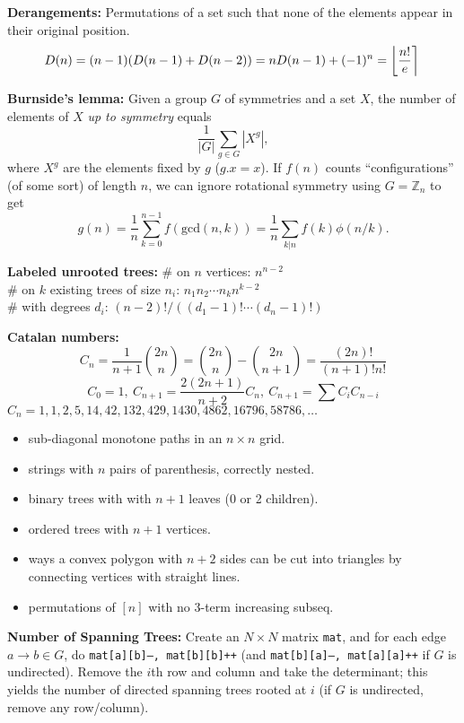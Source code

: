 \noindent
\textbf{Derangements:}
\noindent
Permutations of a set such that none of the elements appear in their original position.
\[ \mkern-2mu D(n) = (n-1)(D(n-1)+D(n-2)) = n D(n-1)+(-1)^n = \left\lfloor\frac{n!}{e}\right\rceil \]

\noindent
\textbf{Burnside's lemma:}
\noindent
Given a group $G$ of symmetries and a set $X$, the number of elements of $X$ \emph{up to symmetry} equals
 \[ {\frac {1}{|G|}}\sum _{{g\in G}}|X^{g}|, \]
 where $X^{g}$ are the elements fixed by $g$ ($g.x = x$).
\noindent
 If $f(n)$ counts ``configurations'' (of some sort) of length $n$, we can ignore rotational symmetry using $G = \mathbb Z_n$ to get
 \[ g(n) = \frac 1 n \sum_{k=0}^{n-1}{f(\text{gcd}(n, k))} = \frac 1 n \sum_{k|n}{f(k)\phi(n/k)}. \]

\noindent
\textbf{Labeled unrooted trees:}
\noindent
\# on $n$ vertices: $n^{n-2}$ \\
\# on $k$ existing trees of size $n_i$: $n_1n_2\cdots n_k n^{k-2}$ \\
\# with degrees $d_i$: $(n-2)! / ((d_1-1)! \cdots (d_n-1)!)$

\noindent
\textbf{Catalan numbers:}
\noindent
\[ C_n=\frac{1}{n+1}\binom{2n}{n}= \binom{2n}{n}-\binom{2n}{n+1} = \frac{(2n)!}{(n+1)!n!} \]
\[ C_0=1,\ C_{n+1} = \frac{2(2n+1)}{n+2}C_n,\ C_{n+1}=\sum C_iC_{n-i} \]
${C_n = 1, 1, 2, 5, 14, 42, 132, 429, 1430, 4862, 16796, 58786, \dots}$
\begin{itemize}
	\item sub-diagonal monotone paths in an $n\times n$ grid.
	\item strings with $n$ pairs of parenthesis, correctly nested.
	\item binary trees with with $n+1$ leaves (0 or 2 children).
	\item ordered trees with $n+1$ vertices.
	\item ways a convex polygon with $n+2$ sides can be cut into triangles by connecting vertices with straight lines.
	\item permutations of $[n]$ with no 3-term increasing subseq.
\end{itemize}

\noindent
\textbf{Number of Spanning Trees:}
\noindent
Create an $N\times N$ matrix \texttt{mat}, and for each edge $a \rightarrow b \in G$, do
\texttt{mat[a][b]--, mat[b][b]++} (and \texttt{mat[b][a]--, mat[a][a]++} if $G$ is undirected).
Remove the $i$th row and column and take the determinant; this yields the number of directed spanning trees rooted at $i$
(if $G$ is undirected, remove any row/column).

